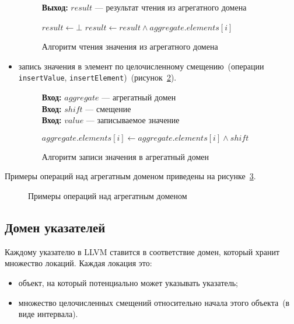 \begin{itemize}
\begin{figure}[h!]
\textbf{Выход:} $result$ --- результат чтения из агрегатного домена

\begin{algorithmic}[1]
\State $result \gets \bot$
    \State $result \gets result \wedge aggregate.elements[i]$
\EndFor
\end{algorithmic}
\caption{Алгоритм чтения значения из агрегатного домена}
\label{image:arrayLoad}
\end{figure}

\item запись значения в элемент по целочисленному смещению~(операции
\texttt{insertValue}, \texttt{insertElement})~(рисунок~\ref{image:arrayStore}).
\begin{figure}[h!]
\textbf{Вход:} $aggregate$ --- агрегатный домен\\
\textbf{Вход:} $shift$ --- смещение\\
\textbf{Вход:} $value$ --- записываемое значение

\begin{algorithmic}[1]
    \State $aggregate.elements[i] \gets aggregate.elements[i] \wedge shift$
\EndFor
\end{algorithmic}
\caption{Алгоритм записи значения в агрегатный домен}
\label{image:arrayStore}
\end{figure}
\end{itemize}

Примеры операций над агрегатным доменом приведены на 
рисунке~\ref{image:aggregateDomain}.
\begin{figure}[h!]
\caption{Примеры операций над агрегатным доменом}
\label{image:aggregateDomain}
\end{figure}

\subsection{Домен указателей}
Каждому указателю в LLVM ставится в соответствие домен, который хранит 
множество локаций. Каждая локация это:
\begin{itemize}
\item объект, на который потенциально может указывать указатель;
\item множество целочисленных смещений относительно начала этого объекта~(в 
виде интервала).
\end{itemize}


